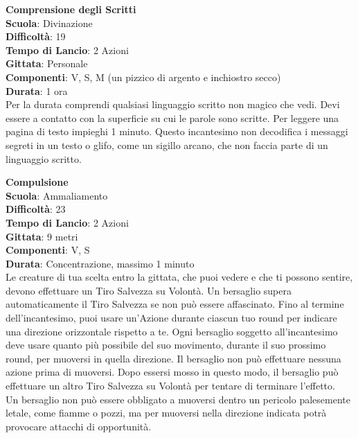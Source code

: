 \begin{multicols}{2}
\medskip\textbf{Comprensione degli Scritti}\\
\textbf{Scuola}: Divinazione\\
\textbf{Difficoltà}: 19\\
\textbf{Tempo di Lancio}: 2 Azioni\\
\textbf{Gittata}: Personale\\
\textbf{Componenti}: V, S, M (un pizzico di argento e inchiostro secco)\\
\textbf{Durata}: 1 ora\\
Per la durata comprendi qualsiasi linguaggio scritto non magico che vedi. Devi essere a contatto con la superficie su cui le parole sono scritte. Per leggere una pagina di testo impieghi 1 minuto. Questo incantesimo non decodifica i messaggi segreti in un testo o glifo, come un sigillo arcano, che non faccia parte di un linguaggio scritto.

\medskip\textbf{Compulsione}\\
\textbf{Scuola}: Ammaliamento\\
\textbf{Difficoltà}: 23\\
\textbf{Tempo di Lancio}: 2 Azioni\\
\textbf{Gittata}: 9 metri\\
\textbf{Componenti}: V, S\\
\textbf{Durata}: Concentrazione, massimo 1 minuto\\
Le creature di tua scelta entro la gittata, che puoi vedere e che ti possono sentire, devono effettuare un Tiro Salvezza su Volontà. Un bersaglio supera automaticamente il Tiro Salvezza se non può essere affascinato. Fino al termine dell'incantesimo, puoi usare un'Azione durante ciascun tuo round per indicare una direzione orizzontale rispetto a te. Ogni bersaglio soggetto all'incantesimo deve usare quanto più possibile del suo movimento, durante il suo prossimo round, per muoversi in quella direzione. Il bersaglio non può effettuare nessuna azione prima di muoversi. Dopo essersi mosso in questo modo, il bersaglio può effettuare un altro Tiro Salvezza su Volontà per tentare di terminare l'effetto.\\
Un bersaglio non può essere obbligato a muoversi dentro un pericolo palesemente letale, come fiamme o pozzi, ma per muoversi nella direzione indicata potrà provocare attacchi di opportunità.


\end{multicols}
